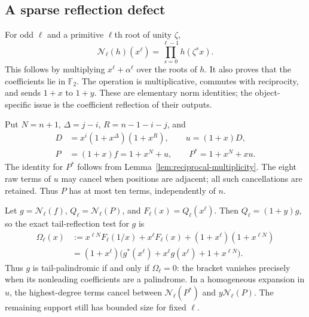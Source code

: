 \documentclass[11pt]{article}
\theoremstyle{definition}
\theoremstyle{remark}
\begin{document}
\subsection{A sparse reflection defect}\label{sec:sparse-norm}
For odd $\ell$ and a primitive $\ell$th root of unity $\zeta$,
\begin{equation}\label{eq:norm-product}
 \mathcal N_\ell(h)(x^\ell)
   =\prod_{s=0}^{\ell-1}h(\zeta^s x).
\end{equation}
This follows by multiplying $x^\ell+\alpha^\ell$ over the roots of $h$.
It also proves that the coefficients lie in $\mathbb F_2$.
The operation is multiplicative, commutes with reciprocity, and sends
$1+x$ to $1+y$. These are elementary norm identities; the
object-specific issue is the coefficient reflection of their outputs.

Put $N=n+1$, $\Delta=j-i$, $R=n-1-i-j$, and
\begin{equation}\label{eq:feedback}
\begin{split}
 D&=x^i(1+x^\Delta)(1+x^R),\qquad u=(1+x)D,\\
 P&=(1+x)f=1+x^N+u,\qquad P^*=1+x^N+xu .
\end{split}
\end{equation}
The identity for $P^*$ follows from
Lemma~\ref{lem:reciprocal-multiplicity}. The eight raw terms of $u$
may cancel when positions are adjacent; all such cancellations are
retained. Thus $P$ has at most ten terms, independently of $n$.

Let $g=\mathcal N_\ell(f)$, $Q_\ell=\mathcal N_\ell(P)$, and
$F_\ell(x)=Q_\ell(x^\ell)$. Then $Q_\ell=(1+y)g$, so the exact
tail-reflection test for $g$ is
\begin{equation}\label{eq:norm-reflection}
\begin{split}
 \Omega_\ell(x)
  &:=
    x^{\ell N}F_\ell(1/x)+x^\ell F_\ell(x)
      +(1+x^\ell)(1+x^{\ell N})\\
  &=(1+x^\ell)
       \bigl(g^*(x^\ell)+x^\ell g(x^\ell)+1+x^{\ell N}\bigr).
\end{split}
\end{equation}
Thus $g$ is tail-palindromic if and only if $\Omega_\ell=0$:
the bracket vanishes precisely when its nonleading coefficients
are a palindrome.
In a homogeneous expansion in $u$, the highest-degree terms cancel
between $\mathcal N_\ell(P^*)$ and $y\mathcal N_\ell(P)$.
The remaining support still has bounded size for fixed $\ell$.
\end{document}
